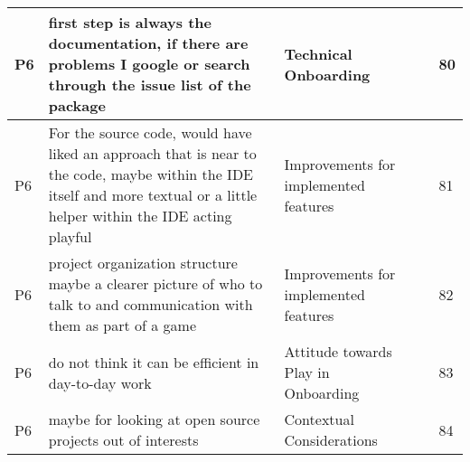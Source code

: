 \begin{appendices}
\begin{landscape}
\begin{longtable}{|p{0.8cm}|p{7cm}|p{3cm}|p{3cm}|p{5.5cm}|p{0.5cm}|}
      P6                   & first step is always the documentation, if there are problems I google or search through the issue list of the package                                                                                                                                                      & Technical Onboarding                     &                                    &                                                                                                                                                    & 80           \\ \hline
      P6                   & For the source code, would have liked an approach that is near to the code, maybe within the IDE itself and more textual or a little helper within the IDE acting playful                                                                                                   & Improvements for implemented features    &                                    &                                                                                                                                                    & 81           \\ \hline
      P6                   & project organization structure maybe a clearer picture of who to talk to and communication with them as part of a game                                                                                                                                                      & Improvements for implemented features    &                                    &                                                                                                                                                    & 82           \\ \hline
      P6                   & do not think it can be efficient in day-to-day work                                                                                                                                                                                                                         & Attitude towards Play in Onboarding      &                                    &                                                                                                                                                    & 83           \\ \hline
      P6                   & maybe for looking at open source projects out of interests                                                                                                                                                                                                                  & Contextual Considerations                &                                    &                                                                                                                                                    & 84           \\ \hline

\end{longtable}
\end{landscape}
\end{appendices}
